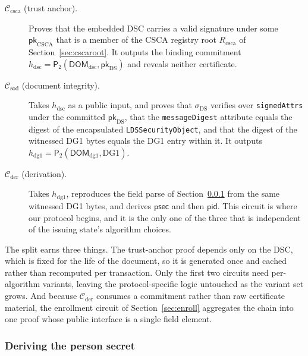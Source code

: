 \documentclass[11pt,a4paper]{article}
\theoremstyle{definition}
\theoremstyle{plain}
\theoremstyle{remark}
\newcommand{\pid}{\ensuremath{\mathsf{pid}}}
\newcommand{\psec}{\ensuremath{\mathsf{psec}}}
\newcommand{\PT}{\ensuremath{\mathsf{P}_2}}
\begin{document}
\begin{description}
\item[$\mathcal{C}_{\mathrm{csca}}$ (trust anchor).] Proves that the embedded DSC carries a valid signature under some $\mathsf{pk}_{\mathrm{CSCA}}$ that is a member of the CSCA registry root $R_{\mathrm{csca}}$ of Section~\ref{sec:cscaroot}. It outputs the binding commitment $h_{\mathrm{dsc}} = \PT(\mathsf{DOM}_{\mathrm{dsc}}, \mathsf{pk}_{\mathrm{DS}})$ and reveals neither certificate.
\item[$\mathcal{C}_{\mathrm{sod}}$ (document integrity).] Takes $h_{\mathrm{dsc}}$ as a public input, and proves that $\sigma_{\mathrm{DS}}$ verifies over \texttt{signedAttrs} under the committed $\mathsf{pk}_{\mathrm{DS}}$, that the \texttt{messageDigest} attribute equals the digest of the encapsulated \texttt{LDSSecurityObject}, and that the digest of the witnessed DG1 bytes equals the DG1 entry within it. It outputs $h_{\mathrm{dg1}} = \PT(\mathsf{DOM}_{\mathrm{dg1}}, \mathrm{DG1})$.
\item[$\mathcal{C}_{\mathrm{der}}$ (derivation).] Takes $h_{\mathrm{dg1}}$, reproduces the field parse of Section~\ref{sec:derive} from the same witnessed DG1 bytes, and derives $\psec$ and then $\pid$. This circuit is where our protocol begins, and it is the only one of the three that is independent of the issuing state's algorithm choices.
\end{description}

The split earns three things. The trust-anchor proof depends only on the DSC, which is fixed for the life of the document, so it is generated once and cached rather than recomputed per transaction. Only the first two circuits need per-algorithm variants, leaving the protocol-specific logic untouched as the variant set grows. And because $\mathcal{C}_{\mathrm{der}}$ consumes a commitment rather than raw certificate material, the enrollment circuit of Section~\ref{sec:enroll} aggregates the chain into one proof whose public interface is a single field element.

\subsubsection{Deriving the person secret}
\label{sec:derive}
\end{document}
